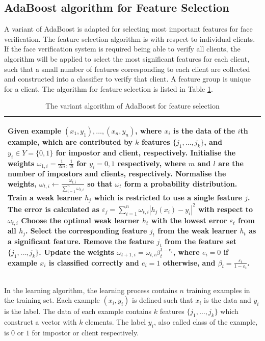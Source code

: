 \subsection{AdaBoost algorithm for Feature Selection}
A variant of AdaBoost is adapted for selecting most important features for face verification. The feature selection algorithm is with respect to individual clients. If the face verification system is required being able to verify all clients, the algorithm will be applied to select the most significant features for each client, such that a small number of features corresponding to each client are collected and constructed into a classifier to verify that client. A feature group is unique for a client. The algorithm for feature selection is listed in \mbox{Table} \ref{tab:adaboostfs}. 
\begin{table}[ht]
\caption{The variant algorithm of AdaBoost for feature selection}
\begin{tabular}{p{\columnwidth}}\\
\hline
\begin{algorithmic}[1]
\STATE Given example $(x_{1},y_{1}),\ldots,(x_{n},y_{n})$, where $x_{i}$ is the data of the $i$th example, which are contributed by $k$ features $\{j_{1},\ldots,j_{k}\}$, and $y_{i} \in Y=\{0,1\}$ for impostor and client, respectively.
\STATE Initialise the weights $\omega_{1,i}=\frac{1}{2m},\frac{1}{2l}$ for $y_{i}=0,1$ respectively, where $m$ and $l$ are the number of impostors and clients, respectively.
\FOR{$t=1,\ldots,T$}
	\STATE Normalise the weights, $\omega_{t,i}\leftarrow\frac{\omega_{t,i}}{\sum_{i=1}^{n}\omega_{t,i}}$ so that $\omega_{t}$ form a probability distribution.
	\FORALL{$\{j_{1},\ldots,j_{k}\}$}
		\STATE Train a weak learner $h_{j}$ which is restricted to use a single feature $j$. 
		\STATE The error is calculated as $\varepsilon_{j}=\sum_{i=1}^{n}\omega_{t,i}|h_{j}(x_{i})-y_{i}|^{2}$ with respect to $\omega_{t,i}$
	\ENDFOR
	\STATE Choose the optimal weak learner $h_{t}$ with the lowest error $\varepsilon_{t}$ from all $h_{j}$.
	\STATE Select the corresponding feature $j_{t}$ from the weak learner $h_{t}$ as a significant feature.
	\STATE Remove the feature $j_{t}$ from the feature set $\{j_{1},\ldots,j_{k}\}$.
	\STATE Update the weights $\omega_{t+1,i}=\omega_{t,i}\beta_{t}^{1-e_{i}}$, where $e_{i}=0$ if example $x_{i}$ is classified correctly and $e_{i}=1$ otherwise, and $\beta_{t}=\frac{\varepsilon_{t}}{1-\varepsilon_{t}}$.	
\ENDFOR
\end{algorithmic}\\
\hline
\end{tabular}
\label{tab:adaboostfs}
\end{table} 
In the learning algorithm, the learning process contains $n$ training examples in the training set. Each example $(x_{i},y_{i})$ is defined such that $x_{i}$ is the data and $y_{i}$ is the label. The data of each example contains $k$ features $\{j_{1},\ldots,j_{k}\}$ which construct a vector with $k$ elements. The label $y_{i}$, also called class of the example, is $0$ or $1$ for impostor or client respectively. 

